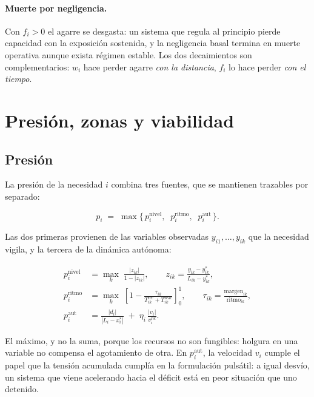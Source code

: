 \documentclass[11pt,a4paper]{article}
\begin{document}
\paragraph{Muerte por negligencia.} Con $f_i>0$ el agarre se desgasta: un sistema que
regula al principio pierde capacidad con la exposición sostenida, y la negligencia basal
termina en muerte operativa aunque exista régimen estable. Los dos decaimientos son
complementarios: $w_i$ hace perder agarre \emph{con la distancia}, $f_i$ lo hace perder
\emph{con el tiempo}.

\section{Presión, zonas y viabilidad}

\subsection{Presión}

La presión de la necesidad $i$ combina tres fuentes, que se mantienen trazables por
separado:

\begin{equation}
  p_i \;=\; \max\Big\{\, p_i^{\text{nivel}},\;\; p_i^{\text{ritmo}},\;\; p_i^{\text{aut}} \,\Big\} .
\end{equation}

Las dos primeras provienen de las variables observadas $y_{i1},\dots,y_{ik}$ que la
necesidad vigila, y la tercera de la dinámica autónoma:

\begin{align}
  p_i^{\text{nivel}} &= \max_k \; \frac{|z_{ik}|}{1-|z_{ik}|},
    \qquad z_{ik}=\frac{y_{ik}-y^{*}_{ik}}{L_{ik}-y^{*}_{ik}}, \\[4pt]
  p_i^{\text{ritmo}} &= \max_k \; \left[1 - \frac{\tau_{ik}}{T^{\text{rec}}_{ik}+T^{\text{reac}}_{ik}}\right]_{0}^{1},
    \qquad \tau_{ik}=\frac{\text{margen}_{ik}}{\text{ritmo}_{ik}}, \\[4pt]
  p_i^{\text{aut}} &= \frac{|d_i|}{|L_i-x_i^{*}|} \;+\; \eta_i\,\frac{|v_i|}{v_i^{\text{ref}}} .
\end{align}

El máximo, y no la suma, porque los recursos no son fungibles: holgura en una variable no
compensa el agotamiento de otra. En $p_i^{\text{aut}}$, la velocidad $v_i$ cumple el papel
que la tensión acumulada cumplía en la formulación pulsátil: a igual desvío, un sistema
que viene acelerando hacia el déficit está en peor situación que uno detenido.
\end{document}
